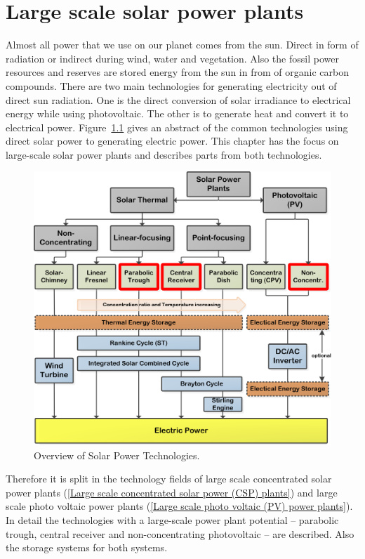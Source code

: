 \chapter{Large scale solar power plants}
Almost all power that we use on our planet comes from the sun. Direct in form of radiation or indirect during wind, water and vegetation. Also the fossil power resources and reserves are stored energy from the sun in from of organic carbon compounds. There are two main technologies for generating electricity out of direct sun radiation. One is the direct conversion of solar irradiance to electrical energy while using photovoltaic. The other is to generate heat and convert it to electrical power. Figure~\ref{OverviewSTP} gives an abstract of the common technologies using direct solar power to generating electric power. This chapter has the focus on large-scale solar power plants and describes parts from both technologies.
\begin{figure}[!h] 
\centering
\includegraphics[width=0.75\linewidth]{FIG/OverviewSTP}
\caption[Overview of Solar Power Technologies.]{Overview of Solar Power Technologies.}\label{OverviewSTP}
\end{figure}


Therefore it is split in the technology fields of large scale concentrated solar power plants (\ref{Large scale concentrated solar power (CSP) plants}) and large scale photo voltaic power plants (\ref{Large scale photo voltaic (PV) power plants}).
In detail the technologies with a large-scale power plant potential -- parabolic trough, central receiver and non-concentrating photovoltaic -- are described. Also the storage systems for both systems. 

